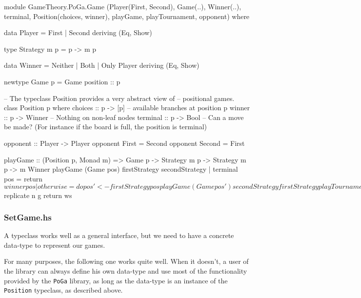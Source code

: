 \begin{code}
module GameTheory.PoGa.Game
       (Player(First, Second),
        Game(..),
        Winner(..),
        terminal,
        Position(choices, winner),
        playGame,
        playTournament,
        opponent)
        where

data Player = First | Second
  deriving (Eq, Show)
           
type Strategy m p = p -> m p

data Winner = Neither | Both | Only Player
  deriving (Eq, Show)


newtype Game p = Game {position :: p}


-- The typeclass Position provides a very abstract view of
-- positional games.
class Position p where
  choices :: p -> [p]     -- available branches at position p
  winner :: p -> Winner   -- Nothing on non-leaf nodes
  terminal :: p -> Bool   -- Can a move be made? (For instance if the board is full,
                                                  the position is terminal)

opponent :: Player -> Player
opponent First = Second
opponent Second = First


playGame :: (Position p, Monad m) =>
  Game p -> Strategy m p -> Strategy m p -> m Winner
playGame (Game pos) firstStrategy secondStrategy
  | terminal pos = return $ winner pos
  | otherwise = do
      pos' <- firstStrategy pos
      playGame (Game pos') secondStrategy firstStrategy
      
playTournament :: (Monad m, Position p) =>
  Int -> Game p -> Strategy m p -> Strategy m p -> m [Winner]
playTournament n game fststrat sndstrat = do
  let g = playGame game fststrat sndstrat
  ws <- sequence $ replicate n g
  return ws
\end{code}

\subsubsection{SetGame.hs}

A typeclass works well as a general interface, but we need to have a concrete data-type to represent our games.

For many purposes, the following one works quite well. When it doesn't, a user of the library can always define his own data-type and use most of the functionality provided by the \texttt{PoGa} library, as long as the data-type is an instance of the \texttt{Position} typeclass, as described above.

